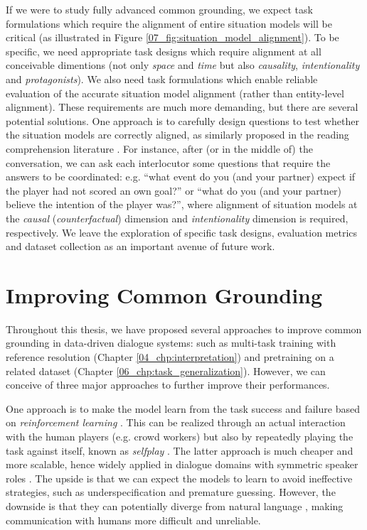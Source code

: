 If we were to study fully advanced common grounding, we expect task formulations which require the alignment of entire situation models will be critical (as illustrated in Figure \ref{07_fig:situation_model_alignment}). To be specific, we need appropriate task designs which require alignment at all conceivable dimentions (not only \textit{space} and \textit{time} but also \textit{causality}, \textit{intentionality} and \textit{protagonists}). We also need task formulations which enable reliable evaluation of the accurate situation model alignment (rather than entity-level alignment). These requirements are much more demanding, but there are several potential solutions. One approach is to carefully design questions to test whether the situation models are correctly aligned, as similarly proposed in the reading comprehension literature \citep{sugawara-etal-2021-benchmarking}. For instance, after (or in the middle of) the conversation, we can ask each interlocutor some questions that require the answers to be coordinated: e.g. ``what event do you (and your partner) expect if the player had not scored an own goal?'' or ``what do you (and your partner) believe the intention of the player was?'', where alignment of situation models at the \textit{causal} (\textit{counterfactual}) dimension and \textit{intentionality} dimension is required, respectively. We leave the exploration of specific task designs, evaluation metrics and dataset collection as an important avenue of future work.

\section{Improving Common Grounding}
\label{07_sec:advanced_common_grounding_models}

Throughout this thesis, we have proposed several approaches to improve common grounding in data-driven dialogue systems: such as multi-task training with reference resolution (Chapter \ref{04_chp:interpretation}) and pretraining on a related dataset (Chapter \ref{06_chp:task_generalization}). However, we can conceive of three major approaches to further improve their performances.

One approach is to make the model learn from the task success and failure based on \textit{reinforcement learning} \citep{sutton2018reinforcement}. This can be realized through an actual interaction with the human players (e.g. crowd workers) but also by repeatedly playing the task against itself, known as \textit{selfplay} \citep{silver2016mastering}. The latter approach is much cheaper and more scalable, hence widely applied in dialogue domains with symmetric speaker roles \citep{lewis-etal-2017-deal,DBLP:conf/icml/YaratsL18,jang2020bayes}. The upside is that we can expect the models to learn to avoid ineffective strategies, such as underspecification and premature guessing. However, the downside is that they can potentially diverge from natural language \citep{kottur-etal-2017-natural}, making communication with humans more difficult and unreliable.

